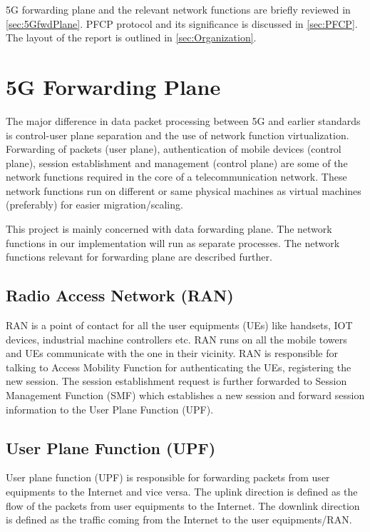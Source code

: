 5G forwarding plane and the relevant network functions are 
briefly reviewed in \ref{sec:5GfwdPlane}. PFCP protocol and its 
significance is discussed in \ref{sec:PFCP}. 
The layout of the report is outlined in \ref{sec:Organization}. 

\section {5G Forwarding Plane \label{sec:5GfwdPlane}}
The major difference in  data packet processing between 5G and earlier standards is control-user plane 
separation and the use of network function virtualization. Forwarding of packets (user plane), 
authentication of mobile devices (control plane), session establishment and management (control plane) are some of the network 
functions required in the core of a telecommunication network. These network functions run on different or same physical machines as 
virtual machines (preferably) for easier migration/scaling.

This project is mainly concerned with data forwarding plane. The network functions in our implementation will 
run as separate processes. The network functions relevant for forwarding plane are described further.
\subsection{Radio Access Network (RAN) \label{sec:RAN}} 
RAN is a point of contact for all the user equipments (UEs) like handsets, IOT devices, industrial machine controllers etc. 
RAN runs on all the mobile towers and UEs communicate with the one in their vicinity. RAN is
 responsible for talking to Access Mobility Function for authenticating the UEs, registering the  new
  session. The session establishment request is further forwarded to Session Management Function
  (SMF) which establishes a new session and forward session information to the User Plane Function (UPF). 
  \subsection{User Plane Function (UPF) \label{sec:UPF}}
  User plane function (UPF) is responsible for forwarding packets from user equipments to the
   Internet and vice versa. The uplink direction is defined as the flow of the packets from user
    equipments to the Internet. The downlink direction is defined as the traffic coming from the Internet  to the user equipments/RAN. 
  
